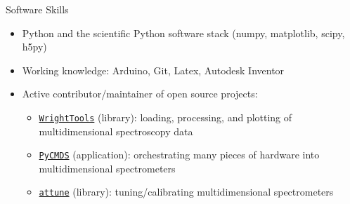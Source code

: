 \documentclass{resume} %
\begin{document}
\begin{rSection}{Software Skills}
	\begin{itemize}[leftmargin = 0 pt]
		\item Python and the scientific Python software stack (numpy, matplotlib, scipy, h5py)
		\item Working knowledge: Arduino, Git, Latex, Autodesk Inventor
		\item Active contributor/maintainer of open source projects:
		\begin{itemize}
			\item \href{http://wright.tools}{\texttt{WrightTools}} (library): loading, processing, and plotting of multidimensional spectroscopy data 
			\item \href{http://github.com/wright-group/PyCMDS}{\texttt{PyCMDS}} (application): orchestrating many pieces of hardware into multidimensional spectrometers  
			\item \href{http://github.com/wright-group/attune}{\texttt{attune}} (library): tuning/calibrating multidimensional spectrometers
		\end{itemize}
		
	\end{itemize}	
\end{rSection}


\end{document}
